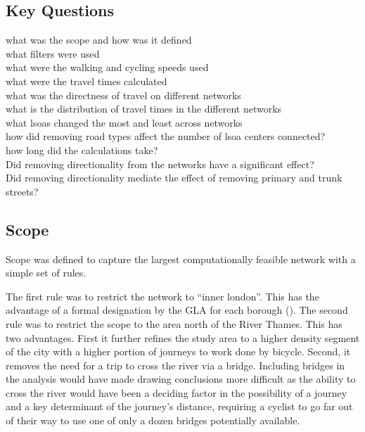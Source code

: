 
\subsection{Key Questions}
what was the scope and how was it defined \\
what filters were used \\
what were the walking and cycling speeds used \\
what were the travel times calculated \\
what was the directness of travel on different networks \\
what is the distribution of travel times in the different networks \\
what lsoas changed the most and least across networks \\
how did removing road types affect the number of lsoa centers connected? \\
how long did the calculations take? \\
Did removing directionality from the networks have a significant effect? \\
Did removing directionality mediate the effect of removing primary and trunk streets? \\


\subsection{Scope}


Scope was defined to capture the largest computationally feasible network with a simple set of rules. 

The first rule was to restrict the network to ``inner london''. This has the advantage of a formal designation by the GLA for each borough (\cite{innerlondon}). The second rule was to restrict the scope to the area north of the River Thames. This has two advantages. First it further refines the study area to a higher density segment of the city with a higher portion of journeys to work done by bicycle. Second, it removes the need for a trip to cross the river via a bridge. Including bridges in the analysis would have made drawing conclusions more difficult as the ability to cross the river would have been a deciding factor in the possibility of a journey and a key determinant of the journey's distance, requiring a cyclist to go far out of their way to use one of only a dozen bridges potentially available. 

